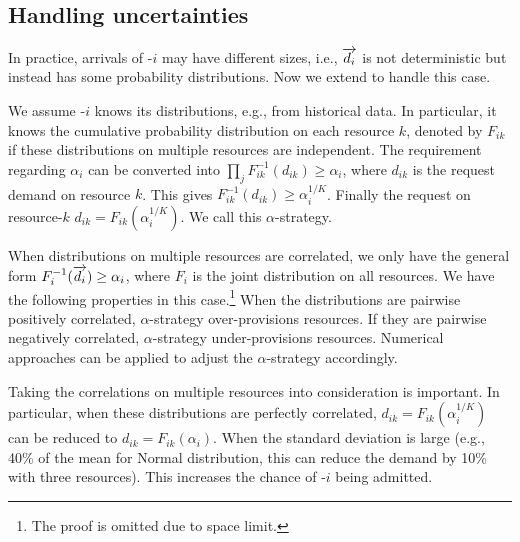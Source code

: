 \subsection{Handling uncertainties}
\label{sec:uncertainties}

In practice, arrivals of {\burstq}-$i$ may have different sizes, i.e., $\protect\overrightarrow{d_i}$ is not deterministic but instead has some probability distributions. Now we extend \name to handle this case.

We assume {\burstq}-$i$ knows its distributions, e.g., from historical data. In particular, it knows the cumulative probability distribution on each resource $k$, denoted by $F_{ik}$ if these distributions on multiple resources are independent. 
The requirement regarding $\alpha_i$ can be converted into $\prod_j F^{-1}_{ik}(d_{ik}) \geq \alpha_i$, where $d_{ik}$ is the request demand on resource $k$. This gives $F^{-1}_{ik}(d_{ik}) \geq \alpha_i^{1/K}$. Finally the request on resource-$k$ $d_{ik}=F_{ik}(\alpha_i^{1/K})$. We call this $\alpha$-strategy.

When distributions on multiple resources are correlated, we only have the general form $F^{-1}_i (\protect\overrightarrow{d_i}) \geq \alpha_i$, where $F_{i}$ is the joint distribution on all resources. We have the following properties in this case.\footnote{The proof is omitted due to space limit.}
When the distributions are pairwise positively correlated, $\alpha$-strategy over-provisions resources. If they are pairwise negatively correlated, $\alpha$-strategy under-provisions resources. Numerical approaches can be applied to adjust the $\alpha$-strategy accordingly. 

Taking the correlations on multiple resources into consideration is important. In particular, when these distributions are perfectly correlated, $d_{ik}=F_{ik}(\alpha_i^{1/K})$ can be reduced to $d_{ik}=F_{ik}(\alpha_i)$. When the standard deviation is large (e.g., 40\% of the mean for Normal distribution, this can reduce the demand by 10\% with three resources). This increases the chance of {\burstq}-$i$ being admitted.





